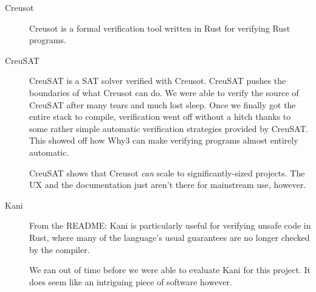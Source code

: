 \documentclass[12pt]{article}
\begin{document}
\begin{description}
  \item[Creusot] \cite{denisCreusot2023} \cite{denisCreusotFoundryDeductive2022}

    Creusot is a formal verification tool written in Rust for verifying Rust programs.

  \item[CreuSAT] \cite{skotamCreuSAT2023}

    CreuSAT is a SAT solver verified with Creusot.
    CreuSAT pushes the boundaries of what Creusot can do.
    We were able to verify the source of CreuSAT after many tears and much lost sleep.
    Once we finally got the entire stack to compile, verification went off without a hitch thanks to some rather simple automatic verification strategies provided by CreuSAT.
    This showed off how Why3 can make verifying programs almost entirely automatic.

    CreuSAT shows that Creusot \emph{can} scale to significantly-sized projects.
    The UX and the documentation just aren't there for mainstream use, however.

  \item[Kani] \cite{Kani2023}

    From the README: Kani is particularly useful for verifying unsafe code in
    Rust, where many of the language's usual guarantees are no longer checked by
    the compiler.

    We ran out of time before we were able to evaluate Kani for this project.
    It does seem like an intriguing piece of software however.

\end{description}

\clearpage
\printbibliography
\end{document}
